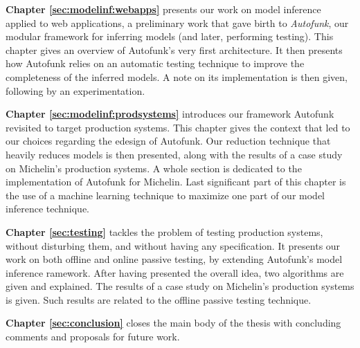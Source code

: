 \textbf{Chapter \ref{sec:modelinf:webapps}} presents our work on
model inference applied to web applications, a preliminary work
that gave birth to \textit{Autofunk}, our modular framework for
inferring models (and later, performing testing). This chapter
gives an overview of Autofunk's very first architecture. It then
presents how Autofunk relies on an automatic testing technique to
improve the completeness of the inferred models. A note on its
implementation is then given, following by an experimentation.


\textbf{Chapter \ref{sec:modelinf:prodsystems}} introduces our
framework Autofunk revisited to target production systems. This
chapter gives the context that led to our choices regarding the
edesign of Autofunk. Our reduction technique that heavily reduces
models is then presented, along with the results of a case study
on Michelin's production systems. A whole section is dedicated to
the implementation of Autofunk for Michelin. Last significant
part of this chapter is the use of a machine learning technique
to maximize one part of our model inference technique.

\textbf{Chapter \ref{sec:testing}} tackles the problem of testing
production systems, without disturbing them, and without having
any specification. It presents our work on both offline and
online passive testing, by extending Autofunk's model inference
ramework. After having presented the overall idea, two algorithms
are given and explained. The results of a case study on
Michelin's production systems is given. Such results are related
to the offline passive testing technique.

\textbf{Chapter \ref{sec:conclusion}} closes the main body of the
thesis with concluding comments and proposals for future work.

\cleardoublepage
\blankpage
